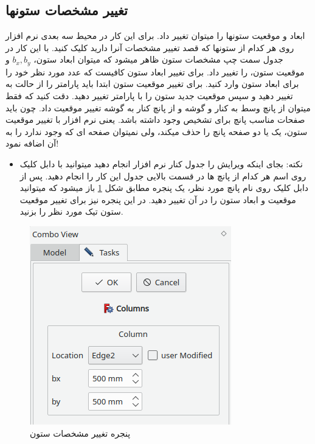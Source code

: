 \subsection{تغییر مشخصات ستونها}
ابعاد و موقعیت ستونها را میتوان تغییر داد. برای این کار در محیط سه بعدی نرم افزار روی هر کدام از ستونها که قصد تغییر مشخصات آنرا دارید کلیک کنید.
با این کار در جدول سمت چپ مشخصات ستون ظاهر میشود که میتوان ابعاد ستون،
$b_x, b_y$
و موقعیت ستون، 
را تغییر داد. برای تغییر ابعاد ستون کافیست که عدد مورد نظر خود را برای ابعاد ستون وارد کنید.
برای تغییر موقعیت ستون ابتدا باید پارامتر 
را از حالت 
به 
تغییر دهید و سپس موقعیت جدید ستون را با پارامتر
تغییر دهید. دقت کنید که فقط میتوان از پانچ وسط به کنار و گوشه 
و از پانچ کنار به گوشه تغییر موقعیت داد. چون باید صفحات مناسب پانچ برای تشخیص وجود داشته باشد.
یعنی نرم افزار با تغییر موقعیت ستون، یک یا دو صفحه پانچ را حذف میکند، ولی نمیتوان صفحه ای که وجود ندارد را به آن اضافه نمود!

\begin{itemize}
    \item نکته: بجای اینکه ویرایش را جدول کنار نرم افزار انجام دهید میتوانید با دابل کلیک روی اسم هر کدام از پانچ ها در قسمت بالایی جدول
    این کار را انجام دهید. پس از دابل کلیک روی نام پانچ مورد نظر، یک پنجره مطابق شکل
    \ref{fig:columnedit}
    باز میشود که میتوانید موقعیت و ابعاد ستون را در آن تغییر دهید. در این پنجره نیز برای تغییر موقعیت ستون تیک مورد نظر را بزنید.
\end{itemize}

\begin{figure}[H]
    \centering
    \includegraphics{figures/columnedit}
    \caption{پنجره تغییر مشخصات ستون}
    \label{fig:columnedit}
\end{figure}
